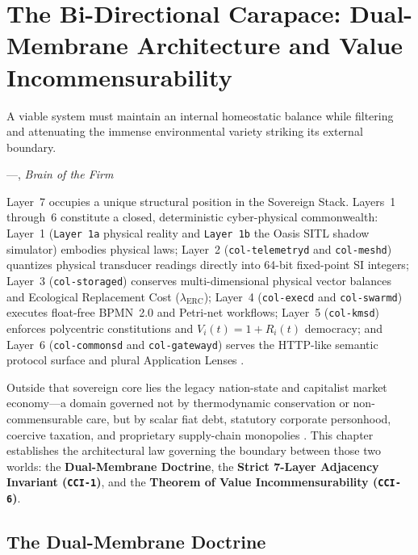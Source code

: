 \chapter{The Bi-Directional Carapace: Dual-Membrane Architecture and Value Incommensurability}
\label{ch:l7-bidirectional-carapace}

\epigraph{A viable system must maintain an internal homeostatic balance while filtering and attenuating the immense environmental variety striking its external boundary.}{---\textcite{beer1972}, \textit{Brain of the Firm}}

Layer~7 occupies a unique structural position in the Sovereign Stack. Layers~1 through~6 constitute a closed, deterministic cyber-physical commonwealth: Layer~1 (\texttt{Layer~1a} physical reality and \texttt{Layer~1b} the Oasis SITL shadow simulator) embodies physical laws; Layer~2 (\texttt{col-telemetryd} and \texttt{col-meshd}) quantizes physical transducer readings directly into 64-bit fixed-point SI integers; Layer~3 (\texttt{col-storaged}) conserves multi-dimensional physical vector balances and Ecological Replacement Cost ($\lambda_{\mathrm{ERC}}$); Layer~4 (\texttt{col-execd} and \texttt{col-swarmd}) executes float-free BPMN~2.0 and Petri-net workflows; Layer~5 (\texttt{col-kmsd}) enforces polycentric constitutions and $V_i(t) = 1 + R_i(t)$ democracy; and Layer~6 (\texttt{col-commonsd} and \texttt{col-gatewayd}) serves the HTTP-like semantic protocol surface and plural Application Lenses \parencite{beer1979,ashby1956}.

Outside that sovereign core lies the legacy nation-state and capitalist market economy---a domain governed not by thermodynamic conservation or non-commensurable care, but by scalar fiat debt, statutory corporate personhood, coercive taxation, and proprietary supply-chain monopolies \parencite{polanyi1944great,georgescu1971entropy}. This chapter establishes the architectural law governing the boundary between those two worlds: the \textbf{Dual-Membrane Doctrine}, the \textbf{Strict 7-Layer Adjacency Invariant (\texttt{CCI-1})}, and the \textbf{Theorem of Value Incommensurability (\texttt{CCI-6})}.

\section{The Dual-Membrane Doctrine}
\label{sec:l7-dual-membrane}

